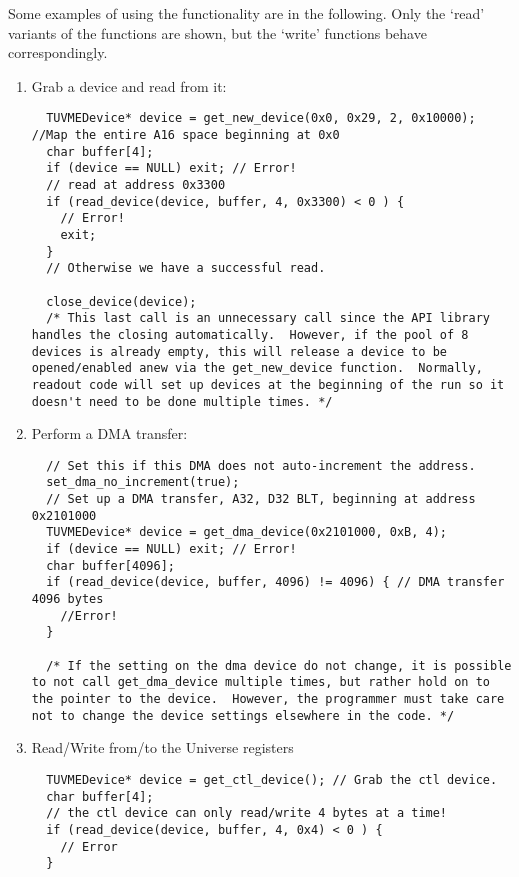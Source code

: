 Some examples of using the functionality are in the following.  Only the `read' variants of the functions are shown, but
the `write' functions behave correspondingly.
			\begin{enumerate}
			\item Grab a device and read from it:
				\begin{lstlisting}
  TUVMEDevice* device = get_new_device(0x0, 0x29, 2, 0x10000); //Map the entire A16 space beginning at 0x0
  char buffer[4];
  if (device == NULL) exit; // Error!
  // read at address 0x3300 
  if (read_device(device, buffer, 4, 0x3300) < 0 ) { 
    // Error!
    exit;
  }
  // Otherwise we have a successful read.

  close_device(device);  
  /* This last call is an unnecessary call since the API library handles the closing automatically.  However, if the pool of 8 devices is already empty, this will release a device to be opened/enabled anew via the get_new_device function.  Normally, readout code will set up devices at the beginning of the run so it doesn't need to be done multiple times. */

				\end{lstlisting}
			\item Perform a DMA transfer:
				\begin{lstlisting}
  // Set this if this DMA does not auto-increment the address.
  set_dma_no_increment(true); 
  // Set up a DMA transfer, A32, D32 BLT, beginning at address 0x2101000
  TUVMEDevice* device = get_dma_device(0x2101000, 0xB, 4); 
  if (device == NULL) exit; // Error!
  char buffer[4096]; 
  if (read_device(device, buffer, 4096) != 4096) { // DMA transfer 4096 bytes
    //Error!
  }

  /* If the setting on the dma device do not change, it is possible to not call get_dma_device multiple times, but rather hold on to the pointer to the device.  However, the programmer must take care not to change the device settings elsewhere in the code. */
				\end{lstlisting}
  			\item Read/Write from/to the Universe registers

				\begin{lstlisting}
  TUVMEDevice* device = get_ctl_device(); // Grab the ctl device. 
  char buffer[4];
  // the ctl device can only read/write 4 bytes at a time!
  if (read_device(device, buffer, 4, 0x4) < 0 ) { 
    // Error
  } 
				\end{lstlisting}

			\end{enumerate}


